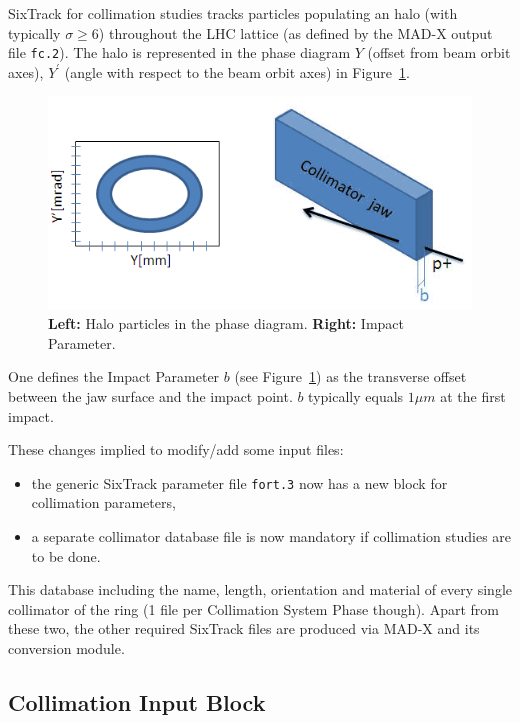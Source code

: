 SixTrack for collimation studies tracks particles populating an halo (with typically $\sigma \geq 6$) throughout the LHC lattice (as defined by the MAD-X output file \texttt{fc.2}).
The halo is represented in the phase diagram $Y$ (offset from beam orbit axes), $Y^\prime$ (angle with respect to the beam orbit axes) in Figure~\ref{Coll:Fig1}.
\begin{figure}[H]
\begin{center}
    \includegraphics[width=0.5\linewidth]{figures/coll_fig1}
    \caption{\label{Coll:Fig1} \textbf{Left:} Halo particles in the phase diagram. \textbf{Right:} Impact Parameter.}
\end{center}
\end{figure}

One defines the Impact Parameter $b$ (see Figure~\ref{Coll:Fig1}) as the transverse offset between the jaw surface and the impact point.
$b$ typically equals $1\mu m$ at the first impact.

\bigskip
\noindent These changes implied to modify/add some input files:
\begin{itemize}
    \item the generic SixTrack parameter file \texttt{fort.3} now has a new block for collimation parameters,
    \item a separate collimator database file is now mandatory if collimation studies are to be done.
\end{itemize}

This database including the name, length, orientation and material of every single collimator of the ring (1 file per Collimation System Phase though).
Apart from these two, the other required SixTrack files are produced via MAD-X and its conversion module.


\subsection{Collimation Input Block} \label{sec:coll:input}


